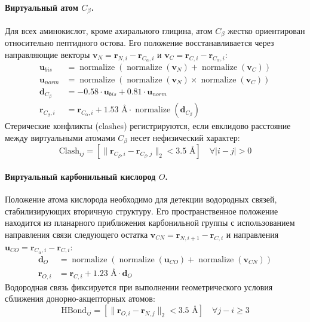 \documentclass[12pt, a4paper]{article}
\begin{document}
\paragraph{Виртуальный атом $C_\beta$.}
Для всех аминокислот, кроме ахирального глицина, атом $C_\beta$ жестко ориентирован относительно пептидного остова. Его положение восстанавливается через направляющие векторы $\mathbf{v}_{N} = \mathbf{r}_{N, i} - \mathbf{r}_{C_\alpha, i}$ и $\mathbf{v}_{C} = \mathbf{r}_{C, i} - \mathbf{r}_{C_\alpha, i}$:
\begin{align}
    \mathbf{u}_{bis} &= \operatorname{normalize}\left(\operatorname{normalize}(\mathbf{v}_N) + \operatorname{normalize}(\mathbf{v}_C)\right) \\
    \mathbf{u}_{norm} &= \operatorname{normalize}\left(\operatorname{normalize}(\mathbf{v}_N) \times \operatorname{normalize}(\mathbf{v}_C)\right) \\
    \mathbf{d}_{C_\beta} &= -0.58 \cdot \mathbf{u}_{bis} + 0.81 \cdot \mathbf{u}_{norm} \\
    \mathbf{r}_{C_\beta, i} &= \mathbf{r}_{C_\alpha, i} + 1.53 \text{ \AA} \cdot \operatorname{normalize}(\mathbf{d}_{C_\beta})
\end{align}
Стерические конфликты (clashes) регистрируются, если евклидово расстояние между виртуальными атомами $C_\beta$ несет нефизический характер:
\begin{equation}
    \text{Clash}_{ij} = [\|\mathbf{r}_{C_\beta, i} - \mathbf{r}_{C_\beta, j}\|_2 < 3.5 \text{ \AA}] \quad \forall |i-j| > 0
\end{equation}

\paragraph{Виртуальный карбонильный кислород $O$.}
Положение атома кислорода необходимо для детекции водородных связей, стабилизирующих вторичную структуру. Его пространственное положение находится из планарного приближения карбонильной группы с использованием направления связи следующего остатка $\mathbf{v}_{CN} = \mathbf{r}_{N, i+1} - \mathbf{r}_{C, i}$ и направления $\mathbf{u}_{CO} = \mathbf{r}_{C_\alpha, i} - \mathbf{r}_{C, i}$:
\begin{align}
    \mathbf{d}_{O} &= \operatorname{normalize}\left(\operatorname{normalize}(\mathbf{u}_{CO}) + \operatorname{normalize}(\mathbf{v}_{CN})\right) \\
    \mathbf{r}_{O, i} &= \mathbf{r}_{C, i} + 1.23 \text{ \AA} \cdot \mathbf{d}_{O}
\end{align}
Водородная связь фиксируется при выполнении геометрического условия сближения донорно-акцепторных атомов:
\begin{equation}
    \text{HBond}_{ij} = [\|\mathbf{r}_{O, i} - \mathbf{r}_{N, j}\|_2 < 3.5 \text{ \AA}] \quad \forall j - i \ge 3
\end{equation}
\end{document}

